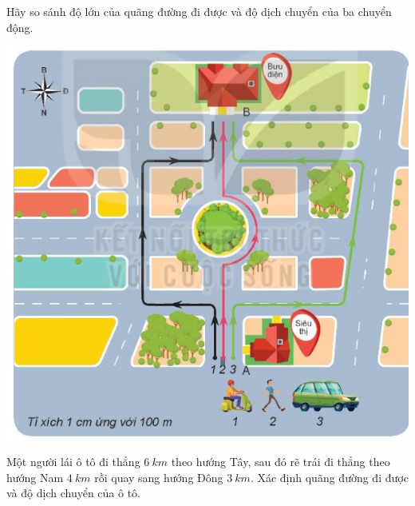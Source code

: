 \begin{ex}
	Hãy so sánh độ lớn của quãng đường đi được và độ dịch chuyển của ba chuyển động. 
	
	\begin{center}
		\includegraphics[scale=0.8]{figs/G10Y25B3-11}
	\end{center}
\end{ex}


\begin{ex}
	Một người lái ô tô đi thẳng $\SI{6}{km}$ theo hướng Tây, sau đó rẽ trái đi thẳng theo hướng Nam $\SI{4}{km}$ rồi quay sang hướng Đông $\SI{3}{km}$. Xác định quãng đường đi được và độ dịch chuyển của ô tô.
\end{ex}


